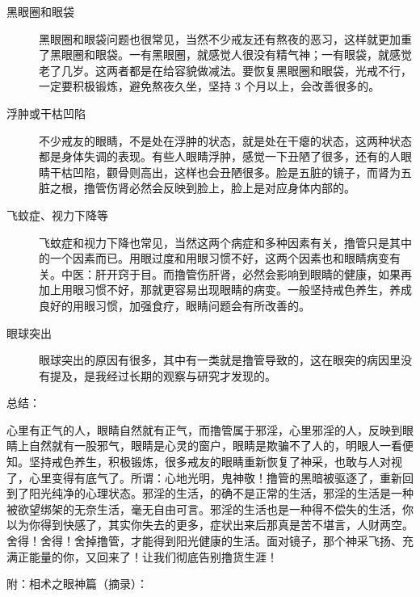 \documentclass{ctexart}
\begin{document}
\begin{description}
    \item[黑眼圈和眼袋] 黑眼圈和眼袋问题也很常见，当然不少戒友还有熬夜的恶习，这样就更加重了黑眼圈和眼袋。一有黑眼圈，就感觉人很没有精气神；一有眼袋，就感觉老了几岁。这两者都是在给容貌做减法。要恢复黑眼圈和眼袋，光戒不行，一定要积极锻炼，避免熬夜久坐，坚持 3 个月以上，会改善很多的。
    \item[浮肿或干枯凹陷] 不少戒友的眼睛，不是处在浮肿的状态，就是处在干瘪的状态，这两种状态都是身体失调的表现。有些人眼睛浮肿，感觉一下丑陋了很多，还有的人眼睛干枯凹陷，颧骨则高出，这样也会丑陋很多。脸是五脏的镜子，而肾为五脏之根，撸管伤肾必然会反映到脸上，脸上是对应身体内部的。
    \item[飞蚊症、视力下降等] 飞蚊症和视力下降也常见，当然这两个病症和多种因素有关，撸管只是其中的一个因素而已。用眼过度和用眼习惯不好，这两个因素也和眼睛病变有关。中医：肝开窍于目。而撸管伤肝肾，必然会影响到眼睛的健康，如果再加上用眼习惯不好，那就更容易出现眼睛的病变。一般坚持戒色养生，养成良好的用眼习惯，加强食疗，眼睛问题会有所改善的。
    \item[眼球突出] 眼球突出的原因有很多，其中有一类就是撸管导致的，这在眼突的病因里没有提及，是我经过长期的观察与研究才发现的。
\end{description}

总结：

心里有正气的人，眼睛自然就有正气，而撸管属于邪淫，心里邪淫的人，反映到眼睛上自然就有一股邪气，眼睛是心灵的窗户，眼睛是欺骗不了人的，明眼人一看便知。坚持戒色养生，积极锻炼，很多戒友的眼睛重新恢复了神采，也敢与人对视了，心里变得有底气了。所谓：心地光明，鬼神敬！撸管的黑暗被驱逐了，重新回到了阳光纯净的心理状态。邪淫的生活，的确不是正常的生活，邪淫的生活是一种被欲望绑架的无奈生活，毫无自由可言。邪淫的生活也是一种得不偿失的生活，你以为你得到快感了，其实你失去的更多，症状出来后那真是苦不堪言，人财两空。舍得！舍得！舍掉撸管，才能得到阳光健康的生活。面对镜子，那个神采飞扬、充满正能量的你，又回来了！让我们彻底告别撸货生涯！

附：相术之眼神篇（摘录）：
\end{document}
